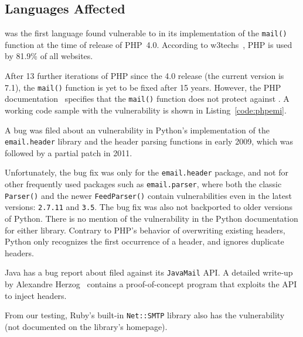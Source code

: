 \subsection{Languages Affected}

\label{languages}
 was the first language found vulnerable to \ehi in its implementation of the \lstinline{mail()} function at the time of release of PHP~4.0. According to w3techs~\cite{W3techs}, PHP is used by 81.9\% of all websites.

After 13 further iterations of PHP since the 4.0 release (the current
version is 7.1), the \texttt{mail()} function is yet to be fixed after
15 years. However, the PHP documentation~\cite{PHPDocs} specifies that the \texttt{mail()} function does not protect against \ehi.
A working code sample with the vulnerability is shown in  Listing~\ref{code:phpemi}.

\begin{sloppypar}
A bug was filed about an \ehi vulnerability in Python's implementation of the \lstinline{email.header} library and the header parsing functions in early 2009, which was followed by a partial patch in 2011.
\end{sloppypar}

Unfortunately, the bug fix was only for the \lstinline{email.header} package, and not for other frequently used packages such as\- \lstinline{email.parser}, where both the classic \lstinline{Parser()} and the newer \lstinline{FeedParser()} contain \ehi vulnerabilities even in the latest versions: \lstinline{2.7.11} and \lstinline{3.5}. The bug fix was also not backported to older versions of Python.
There is no mention of the vulnerability in the Python documentation for either library. Contrary to PHP's behavior of overwriting existing headers, Python only recognizes the first occurrence of a header, and ignores duplicate headers.

Java has a bug report about \ehi filed against its \lstinline{JavaMail} API. A detailed write-up by Alexandre Herzog~\cite{Herzog.2014} contains a proof-of-concept program that exploits the API to inject headers.

From our testing, Ruby's built-in \lstinline{Net::SMTP} library also has the vulnerability (not documented on the library's homepage).


